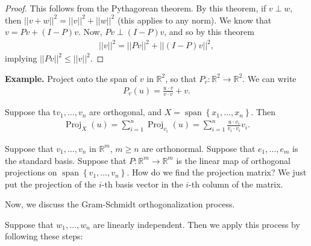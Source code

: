 \documentclass{article}
\newcommand{\RR}{\mathbb{R}}
\DeclareMathOperator{\Span}{span}
\DeclareMathOperator{\Proj}{Proj}
\begin{document}
\begin{proof}
  This follows from the Pythagorean theorem.  By this theorem, if $v \perp w$, then $||v + w||^2 = ||v||^2 + ||w||^2$ (this applies to any norm).  We know that $v = P v + (I - P) v$.  Now, $Pv \perp (I - P) v$, and so by this theorem
  \begin{align*}
    ||v||^2 = || P v||^2 + ||(I - P) v||^2,
  \end{align*}
  implying $||P v||^2 \leq ||v||^2$.
\end{proof}

{\bf Example.} Project onto the span of $v$ in $\RR^2$, so that $P_v : \RR^2 \to \RR^2$.  We can write
\begin{align*}
  P_v(u) = \frac{u \cdot v}{v \cdot v} + v.
\end{align*}


Suppose tha t$v_1, \dots, v_n$ are orthogonal, and $X = \Span \left\{ x_1, \dots, x_n \right\}$.  Then
\begin{align*}
  \Proj_{X}(u) = \sum_{i=1}^{n} \Proj_{v_i} (u) = \sum_{i=1}^{n} \frac{u \cdot v_i}{ v_i \cdot v_i} v_i.
\end{align*}

Suppose that $v_1, \dots, v_n$ in $\RR^m$, $m \geq n$ are orthonormal.  Suppose that $e_1, \dots, e_m$ is the standard basis.  Suppose that $P: \RR^m \to \RR^m$ is the linear map of orthogonal projections on $\Span \left\{ v_1, \dots, v_n \right\}$. 
How do we find the projection matrix?  We just put the projection of the $i$-th basis vector in the $i$-th column of the matrix.

Now, we discuss the Gram-Schmidt orthogonalization process.

Suppose that $w_1, \dots, w_n$ are linearly independent.  Then we apply this process by following these steps:
\end{document}
